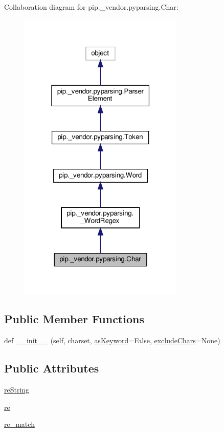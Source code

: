Collaboration diagram for pip.\+\_\+vendor.\+pyparsing.\+Char\+:
\nopagebreak
\begin{figure}[H]
\begin{center}
\leavevmode
\includegraphics[width=223pt]{classpip_1_1__vendor_1_1pyparsing_1_1Char__coll__graph}
\end{center}
\end{figure}
\subsection*{Public Member Functions}
\begin{DoxyCompactItemize}
\item 
def \hyperlink{classpip_1_1__vendor_1_1pyparsing_1_1Char_a1c980c03a977b0e38935ddb65ec73771}{\+\_\+\+\_\+init\+\_\+\+\_\+} (self, charset, \hyperlink{classpip_1_1__vendor_1_1pyparsing_1_1Word_a417fbb59497f780426040fb713ae08dc}{as\+Keyword}=False, \hyperlink{namespacepip_1_1__vendor_1_1pyparsing_a0d91a975c3e4cd362b4cf0f821369244}{exclude\+Chars}=None)
\end{DoxyCompactItemize}
\subsection*{Public Attributes}
\begin{DoxyCompactItemize}
\item 
\hyperlink{classpip_1_1__vendor_1_1pyparsing_1_1Char_accf8faf2e961050888fe8a9b572ab843}{re\+String}
\item 
\hyperlink{classpip_1_1__vendor_1_1pyparsing_1_1Char_ae1a8f12478b40001051ddee934dd39a6}{re}
\item 
\hyperlink{classpip_1_1__vendor_1_1pyparsing_1_1Char_a09ea91e5d39f9e9b3d2293d31abaf385}{re\+\_\+match}
\end{DoxyCompactItemize}
